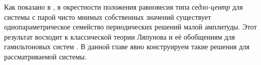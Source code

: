 Как показано в \cite{siegel}, в окрестности положения равновесия типа \textit{седло-центр} для системы с парой чисто мнимых собственных значений существует однопараметрическое семейство периодических решений малой амплитуды. Этот результат восходит к классической теории Ляпунова \cite{lyapunov1892} и её обобщениям для гамильтоновых систем \cite{moser1958,weinstein1973}. В данной главе явно конструируем такие решения для рассматриваемой системы.  
